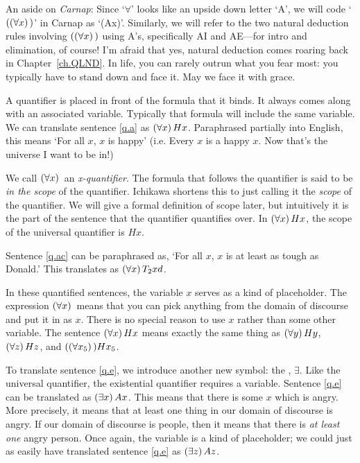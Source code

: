 {\color{black} An aside on \textit{Carnap}: Since `$\forall$' looks like an upside down letter `A', we will code `$((\forall x) \,)$' in Carnap as `(Ax)'. Similarly, we will refer to the two natural deduction rules involving $((\forall x) \,)$ using A's, specifically AI and AE---for intro and elimination, of course! I'm afraid that yes, natural deduction comes roaring back in Chapter~\ref{ch.QLND}. In life, you can rarely outrun what you fear most: you typically have to stand down and face it. May we face it with grace.}

A quantifier is placed in front of the formula that it binds. It always comes along with an associated variable. Typically that formula will include the same variable. We can translate sentence \ref{q.a} as $(\forall x) \, Hx$. Paraphrased partially into English, this means `For all $x$, $x$ is happy' {\color{black}(i.e. Every $x$ is a happy $x$. Now that's the universe I want to be in!)}

We call $(\forall x) \,$ an \emph{x-quantifier}. The formula that follows the quantifier is said to be \emph{in the scope} of the quantifier. {\color{black}Ichikawa shortens this to just calling it the \emph{scope} of the quantifier.} We will give a formal definition of scope later, but intuitively it is the part of the sentence that the quantifier quantifies over. In $(\forall x) \, Hx$, the scope of the universal quantifier is $Hx$.

Sentence \ref{q.ac} can be paraphrased as, `For all $x$, $x$ is at least as tough as Donald.' This translates as $(\forall x) \, T_2xd$.

In these quantified sentences, the variable $x$ serves as a kind of placeholder. The expression $(\forall x) \,$ means that you can pick anything from the domain of discourse and put it in as $x$. There is no special reason to use $x$ rather than some other variable. The sentence $(\forall x) \, Hx$ means exactly the same thing as $(\forall y) \, Hy$, $(\forall z) \, Hz$, and $((\forall x_5) \,) Hx_5$.

To translate sentence \ref{q.e}, we introduce another new symbol: the , $\exists$. Like the universal quantifier, the existential quantifier requires a variable. Sentence \ref{q.e} can be translated as $(\exists x) \, Ax$. This means that there is some $x$ which is angry. {\color{black}More precisely, it means that at least one thing in our domain of discourse is angry. If our domain of discourse is people, then} it means that there is \emph{at least one} angry person. Once again, the variable is a kind of placeholder; we could just as easily have translated sentence \ref{q.e} as $(\exists z) \, Az$.


